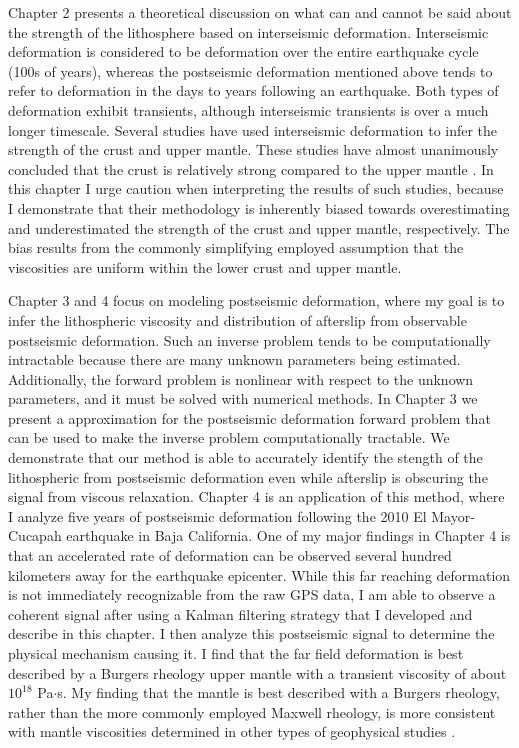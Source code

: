 Chapter 2 presents a theoretical discussion on what can and cannot be said about the strength of the lithosphere based on interseismic deformation. Interseismic deformation is considered to be deformation over the entire earthquake cycle (100s of years), whereas the postseismic deformation mentioned above tends to refer to deformation in the days to years following an earthquake. Both types of deformation exhibit transients, although interseismic transients is over a much longer timescale. Several studies have used interseismic deformation to infer the strength of the crust and upper mantle. These studies have almost unanimously concluded that the crust is relatively strong compared to the upper mantle \citep{Thatcher2008}. In this chapter I urge caution when interpreting the results of such studies, because I demonstrate that their methodology is inherently biased towards overestimating and underestimated the strength of the crust and upper mantle, respectively. The bias results from the commonly simplifying employed assumption that the viscosities are uniform within the lower crust and upper mantle. 

Chapter 3 and 4 focus on modeling postseismic deformation, where my goal is to infer the lithospheric viscosity and distribution of afterslip from observable postseismic deformation. Such an inverse problem tends to be computationally intractable because there are many unknown parameters being estimated. Additionally, the forward problem is nonlinear with respect to the unknown parameters, and it must be solved with numerical methods. In Chapter 3 we present a approximation for the postseismic deformation forward problem that can be used to make the inverse problem computationally tractable. We demonstrate that our method is able to accurately identify the stength of the lithospheric from postseismic deformation even while afterslip is obscuring the signal from viscous relaxation. Chapter 4 is an application of this method, where I analyze five years of postseismic deformation following the 2010 El Mayor-Cucapah earthquake in Baja California. One of my major findings in Chapter 4 is that an accelerated rate of deformation can be observed several hundred kilometers away for the earthquake epicenter. While this far reaching deformation is not immediately recognizable from the raw GPS data, I am able to observe a coherent signal after using a Kalman filtering strategy that I developed and describe in this chapter. I then analyze this postseismic signal to determine the physical mechanism causing it. I find that the far field deformation is best described by a Burgers rheology upper mantle with a transient viscosity of about $10^{18}$ Pa$\cdot$s. My finding that the mantle is best described with a Burgers rheology, rather than the more commonly employed Maxwell rheology, is more consistent with mantle viscosities determined in other types of geophysical studies \citep[e.g.,][]{Crittenden1967,Bills1987}.    

